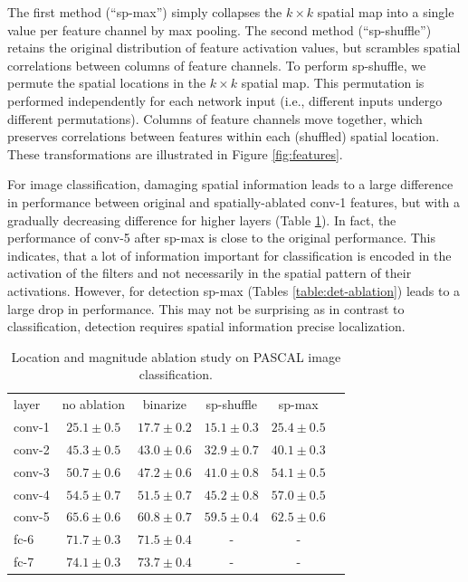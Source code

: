 The first method (``sp-max'') simply collapses the $k \times k$ spatial map into a single value per feature channel by max pooling. The second method (``sp-shuffle'') retains the original distribution of feature activation values, but scrambles spatial correlations between columns of feature channels. To perform sp-shuffle, we permute the spatial locations in the $k \times k$ spatial map. This permutation is performed independently for each network input (i.e., different inputs undergo different permutations). Columns of feature channels move together, which preserves correlations between features within each (shuffled) spatial location. These transformations are illustrated in Figure \ref{fig:features}.

For image classification, damaging spatial information leads to a large difference in performance between original and spatially-ablated conv-1 features, but with a gradually decreasing difference for higher layers (Table \ref{table:class-ablation}). 
In fact, the performance of conv-5 after sp-max is close to the original performance. 
This indicates, that a lot of information important for classification is encoded in the activation of the filters and not necessarily in the spatial pattern of their activations. 
However, for detection sp-max (Tables \ref{table:det-ablation}) leads to a large drop in performance. 
This may not be surprising as in contrast to classification, detection requires spatial information precise localization.

\setlength{\tabcolsep}{4pt}
\begin{table}[t!]
\begin{center}
\caption{Location and magnitude ablation study on PASCAL image classification.}
\label{table:class-ablation}
\begin{tabular}{lccccc}
\hline\noalign{\smallskip}
layer & no ablation & binarize & sp-shuffle & sp-max \\
\noalign{\smallskip}
\hline
\noalign{\smallskip}
conv-1 & $25.1 \pm 0.5$ & $17.7 \pm 0.2$ & $15.1 \pm 0.3$ & $25.4 \pm 0.5$  \\ 
conv-2 & $45.3 \pm 0.5$ & $43.0 \pm 0.6$ & $32.9 \pm 0.7$ & $40.1 \pm 0.3$  \\ 
conv-3 & $50.7 \pm 0.6$ & $47.2 \pm 0.6$ & $41.0 \pm 0.8$ & $54.1 \pm 0.5$  \\
conv-4 & $54.5 \pm 0.7$ & $51.5 \pm 0.7$ & $45.2 \pm 0.8$ & $57.0 \pm 0.5$  \\
conv-5 & $65.6 \pm 0.6$ & $60.8 \pm 0.7$ & $59.5 \pm 0.4$ & $62.5 \pm 0.6$  \\
fc-6   & $71.7 \pm 0.3$ & $71.5 \pm 0.4$ &  -             &  -   \\
fc-7   & $74.1 \pm 0.3$ & $73.7 \pm 0.4$ &  -             &  -   \\
\hline
\end{tabular}
\end{center}
\end{table}
\setlength{\tabcolsep}{1.4pt}


